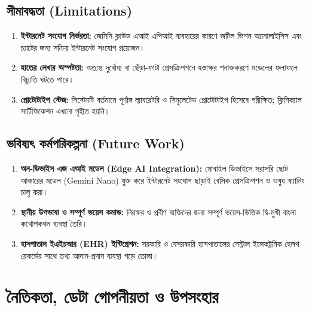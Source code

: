 \documentclass[12pt,a4paper,oneside]{report}
\begin{document}
\section{সীমাবদ্ধতা (Limitations)}
\begin{enumerate}
    \item \textbf{ইন্টারনেট সংযোগ নির্ভরতা:} জেমিনি ক্লাউড এআই এপিআই ব্যবহারের কারণে জটিল ভিশন অ্যানালাইসিস এবং চ্যাটের জন্য সক্রিয় ইন্টারনেট সংযোগ প্রয়োজন।
    \item \textbf{হাতের লেখার অস্পষ্টতা:} অত্যন্ত দুর্বোধ্য বা ছেঁড়া-ফাটা প্রেসক্রিপশনে হস্তাক্ষর শনাক্তকরণে মডেলের ফলাফলে বিচ্যুতি ঘটতে পারে।
    \item \textbf{প্রোটোটাইপ স্টেজ:} সিস্টেমটি বর্তমানে পূর্ণাঙ্গ ল্যাবরেটরি ও সিমুলেটেড প্রোটোটাইপ হিসেবে পরীক্ষিত; ক্লিনিক্যাল সার্টিফিকেশন এখনো গৃহীত হয়নি।
\end{enumerate}

\section{ভবিষ্যৎ কর্মপরিকল্পনা (Future Work)}
\begin{enumerate}
    \item \textbf{অন-ডিভাইস এজ এআই মডেল (Edge AI Integration):} মোবাইল ডিভাইসে সরাসরি ছোট আকারের মডেল (Gemini Nano) যুক্ত করে ইন্টারনেট সংযোগ ছাড়াই বেসিক প্রেসক্রিপশন ও ওষুধ স্ক্যানিং চালু করা।
    \item \textbf{স্থানীয় উপভাষা ও সম্পূর্ণ ভয়েস কমান্ড:} নিরক্ষর ও প্রবীণ ব্যক্তিদের জন্য সম্পূর্ণ ভয়েস-ভিত্তিক দ্বি-মুখী বাংলা কথোপকথন ব্যবস্থা তৈরি।
    \item \textbf{হাসপাতাল ইএইচআর (EHR) ইন্টিগ্রেশন:} সরকারি ও বেসরকারি হাসপাতালের সেন্ট্রাল ইলেকট্রনিক হেলথ রেকর্ডের সাথে তথ্য আদান-প্রদান ব্যবস্থা গড়ে তোলা।
\end{enumerate}

\chapter{নৈতিকতা, ডেটা গোপনীয়তা ও উপসংহার}
\end{document}
